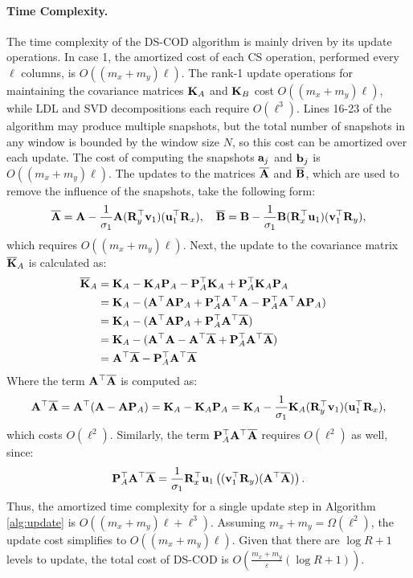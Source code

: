 \paragraph{Time Complexity.} The time complexity of the DS-COD algorithm is mainly driven by its update operations. In case 1, the amortized cost of each CS operation, performed every $\ell$ columns, is $O((m_x + m_y) \ell)$. The rank-1 update operations for maintaining the covariance matrices ${\bf K}_A$ and ${\bf K}_B$ cost $O((m_x + m_y) \ell)$, while LDL and SVD decompositions each require $O(\ell^3)$.
Lines 16-23 of the algorithm may produce multiple snapshots, but the total number of snapshots in any window is bounded by the window size $N$, so this cost can be amortized over each update. The cost of computing the snapshots ${\bf{a}}_j$ and ${\bf{b}}_j$ is $O((m_x + m_y) \ell)$. The updates to the matrices $\overline{{\bf A}}$ and $\overline{{\bf B}}$, which are used to remove the influence of the snapshots, take the following form:
$$\overline{{\bf A}} = {\bf A} - \frac{1}{\sigma_1} {\bf A} ({\bf R}_y^\top {\bf{v}}_1)({\bf{u}}_1^\top {\bf R}_x), \quad \overline{{\bf B}} = {\bf B} - \frac{1}{\sigma_1} {\bf B} ({\bf R}_x^\top {\bf{u}}_1)({\bf{v}}_1^\top {\bf R}_y),$$
which requires $O((m_x + m_y) \ell)$.
Next, the update to the covariance matrix $\overline{{\bf K}}_A$ is calculated as:
\begin{align}
    \overline{{\bf K}}_A &={\bf K}_A-{\bf K}_A{\bf P}_A-{\bf P}_A^\top{\bf K}_A+{\bf P}_A^\top{\bf K}_A{\bf P}_A \nonumber\\
    &= {\bf K}_A-({\bf A}^\top{\bf A}{\bf P}_A+{\bf P}_A^\top{\bf A}^\top{\bf A}-{\bf P}_A^\top{\bf A}^\top{\bf A}{\bf P}_A) \nonumber\\
    &= {\bf K}_A-({\bf A}^\top{\bf A}{\bf P}_A+{\bf P}_A^\top{\bf A}^\top\overline{{\bf A}}) \nonumber\\
    &= {\bf K}_A-({\bf A}^\top{\bf A}-{\bf A}^\top\overline{{\bf A}}+{\bf P}_A^\top{\bf A}^\top\overline{{\bf A}}) \nonumber\\
    &= {\bf A}^\top\overline{{\bf A}} - {\bf P}_A^\top{\bf A}^\top\overline{{\bf A}} \nonumber&
\end{align}
Where the term ${\bf A}^\top \overline{{\bf A}}$ is computed as:
$${\bf A}^\top \overline{{\bf A}} = {\bf A}^\top ({\bf A} - {\bf A} {\bf P}_A) = {\bf K}_A - {\bf K}_A {\bf P}_A = {\bf K}_A - \frac{1}{\sigma_1} {\bf K}_A ({\bf R}_y^\top {\bf{v}}_1)({\bf{u}}_1^\top {\bf R}_x),$$
which costs $O(\ell^2)$. Similarly, the term ${\bf P}_A^\top {\bf A}^\top \overline{{\bf A}}$ requires $O(\ell^2)$ as well, since:
$${\bf P}_A^\top {\bf A}^\top \overline{{\bf A}} = \frac{1}{\sigma_1} {\bf R}_x^\top {\bf{u}}_1 \left( ({\bf{v}}_1^\top {\bf R}_y) ({\bf A}^\top \overline{{\bf A}}) \right).$$
Thus, the amortized time complexity for a single update step in Algorithm \ref{alg:update} is $O((m_x + m_y)\ell + \ell^3)$. Assuming $m_x + m_y = \Omega(\ell^2)$, the update cost simplifies to $O((m_x + m_y)\ell)$. Given that there are $\log{R}+1$ levels to update, the total cost of DS-COD is $O\left( \frac{m_x + m_y}{\varepsilon} (\log{R}+1) \right)$.

